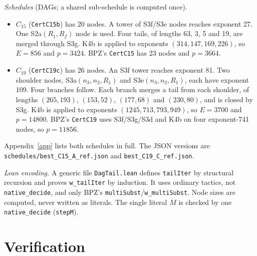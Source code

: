 \documentclass[11pt]{amsart}
\newcommand{\code}[1]{\texttt{#1}}
\begin{document}
\emph{Schedules} (DAGs; a shared sub-schedule is computed once).
\begin{itemize}
\item $C_{15}$ (\code{CertC15b}) has 20 nodes. A tower of S3f/S3e nodes reaches exponent 27. One
S2a$(R_1,R_f)$ node is used. Four tails, of lengths 63, 3, 5 and 19, are merged through S3g. K4b
is applied to exponents $(314,147,169,226)$, so $E=856$ and $p=3424$. BPZ's \code{CertC15} has
23 nodes and $p=3664$.
\item $C_{19}$ (\code{CertC19c}) has 26 nodes. An S3f tower reaches exponent 81. Two shoulder
nodes, S3a$(n_3,n_2,R_1)$ and S3e$(n_3,n_2,R_1)$, each have exponent 109. Four branches follow.
Each branch merges a tail from each shoulder, of lengths $(265,193)$, $(153,52)$, $(177,68)$ and
$(230,80)$, and is closed by S3g. K4b is applied to exponents $(1245,713,793,949)$, so $E=3700$ and
$p=14800$. BPZ's \code{CertC19} uses S3f/S3g/S3d and K4b on four exponent-741 nodes, so
$p=11856$.
\end{itemize}
Appendix~\ref{app} lists both schedules in full. The JSON versions are
\code{schedules/best\_C15\_A\_ref.json} and \code{best\_C19\_C\_ref.json}.

\emph{Lean encoding.} A generic file \code{DagTail.lean} defines \code{tailIter} by structural
recursion and proves \code{w\_tailIter} by induction. It uses ordinary tactics, not
\code{native\_decide}, and only BPZ's \code{multiSubst}/\code{w\_multiSubst}. Node sizes are
computed, never written as literals. The single literal $M$ is checked by one
\code{native\_decide} (\code{stepM}).

\section{Verification}
\end{document}
